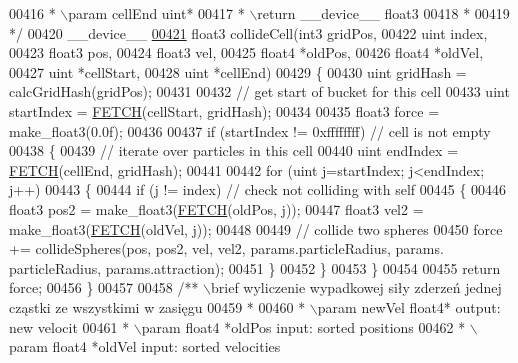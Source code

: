 \begin{DoxyCode}
00416 \textcolor{comment}{ * \(\backslash\)param cellEnd uint*}
00417 \textcolor{comment}{ * \(\backslash\)return \_\_device\_\_ float3}
00418 \textcolor{comment}{ *}
00419 \textcolor{comment}{ */}
00420 \_\_device\_\_
\hypertarget{particles__kernel__impl_8cuh_source_l00421}{}\hyperlink{particles__kernel__impl_8cuh_a8e623e11d4ac873cfbe9d7c916326363}{00421} float3 collideCell(int3    gridPos,
00422                    uint    index,
00423                    float3  pos,
00424                    float3  vel,
00425                    float4 *oldPos,
00426                    float4 *oldVel,
00427                    uint   *cellStart,
00428                    uint   *cellEnd)
00429 \{
00430     uint gridHash = calcGridHash(gridPos);
00431 
00432     \textcolor{comment}{// get start of bucket for this cell}
00433     uint startIndex = \hyperlink{particles__kernel_8cuh_a12269d678a65f18889c2a7e98c756457}{FETCH}(cellStart, gridHash);
00434 
00435     float3 force = make\_float3(0.0f);
00436 
00437     \textcolor{keywordflow}{if} (startIndex != 0xffffffff)          \textcolor{comment}{// cell is not empty}
00438     \{
00439         \textcolor{comment}{// iterate over particles in this cell}
00440         uint endIndex = \hyperlink{particles__kernel_8cuh_a12269d678a65f18889c2a7e98c756457}{FETCH}(cellEnd, gridHash);
00441 
00442         \textcolor{keywordflow}{for} (uint j=startIndex; j<endIndex; j++)
00443         \{
00444             \textcolor{keywordflow}{if} (j != index)                \textcolor{comment}{// check not colliding with self}
00445             \{
00446                 float3 pos2 = make\_float3(\hyperlink{particles__kernel_8cuh_a12269d678a65f18889c2a7e98c756457}{FETCH}(oldPos, j));
00447                 float3 vel2 = make\_float3(\hyperlink{particles__kernel_8cuh_a12269d678a65f18889c2a7e98c756457}{FETCH}(oldVel, j));
00448 
00449                 \textcolor{comment}{// collide two spheres}
00450                 force += collideSpheres(pos, pos2, vel, vel2, params.particleRadius, params.
      particleRadius, params.attraction);
00451             \}
00452         \}
00453     \}
00454 
00455     \textcolor{keywordflow}{return} force;
00456 \}
00457 
00458 \textcolor{comment}{/** \(\backslash\)brief wyliczenie wypadkowej siły zderzeń jednej cząstki ze wszystkimi w zasięgu}
00459 \textcolor{comment}{ *}
00460 \textcolor{comment}{ * \(\backslash\)param newVel float4* output: new velocit}
00461 \textcolor{comment}{ * \(\backslash\)param float4 *oldPos input: sorted positions}
00462 \textcolor{comment}{ * \(\backslash\)param float4 *oldVel input: sorted velocities}

\end{DoxyCode}
